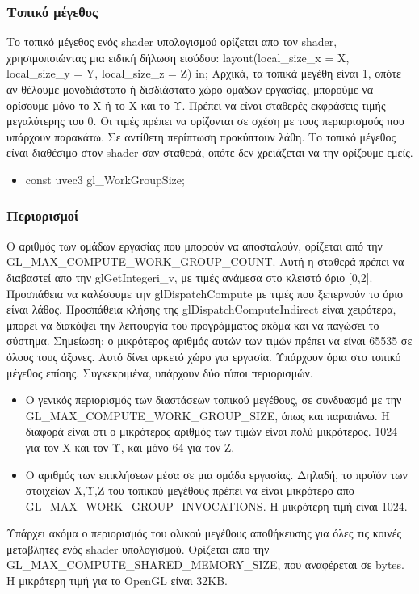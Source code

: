 \subsubsection{Τοπικό μέγεθος}
Το τοπικό μέγεθος ενός shader υπολογισμού ορίζεται απο τον shader, χρησιμοποιώντας μια ειδική δήλωση εισόδου: 
layout(local\_size\_x = X, local\_size\_y = Y, local\_size\_z = Z) in;
Αρχικά, τα τοπικά μεγέθη είναι 1, οπότε αν θέλουμε μονοδιάστατο ή δισδιάστατο χώρο ομάδων εργασίας, μπορούμε να ορίσουμε μόνο το Χ ή το Χ και το Υ. Πρέπει να είναι σταθερές εκφράσεις τιμής μεγαλύτερης του 0. Οι τιμές πρέπει να ορίζονται σε σχέση με τους περιορισμούς που υπάρχουν παρακάτω. Σε αντίθετη περίπτωση προκύπτουν λάθη. Το τοπικό μέγεθος είναι διαθέσιμο στον shader σαν σταθερά, οπότε δεν χρειάζεται να την ορίζουμε εμείς.
\begin{itemize}
\item const uvec3 gl\_WorkGroupSize;
\end{itemize}
\subsubsection{Περιορισμοί}
Ο αριθμός των ομάδων εργασίας που μπορούν να αποσταλούν, ορίζεται από την GL\_MAX\_COMPUTE\_WORK\_GROUP\_COUNT. Αυτή η σταθερά πρέπει να διαβαστεί απο την glGetIntegeri\_v, με τιμές ανάμεσα στο κλειστό όριο [0,2]. Προσπάθεια να καλέσουμε την glDispatchCompute με τιμές που ξεπερνούν το όριο είναι λάθος. Προσπάθεια κλήσης της glDispatchComputeIndirect είναι χειρότερα, μπορεί να διακόψει την λειτουργία του προγράμματος ακόμα και να παγώσει το σύστημα. Σημείωση: ο μικρότερος αριθμός αυτών των τιμών πρέπει να είναι 65535 σε όλους τους άξονες. Αυτό δίνει αρκετό χώρο για εργασία. Υπάρχουν όρια στο τοπικό μέγεθος επίσης. Συγκεκριμένα, υπάρχουν δύο τύποι περιορισμών. 
\begin{itemize}
\item Ο γενικός περιορισμός των διαστάσεων τοπικού μεγέθους, σε συνδυασμό με την GL\_MAX\_COMPUTE\_WORK\_GROUP\_SIZE, όπως και παραπάνω. Η διαφορά είναι οτι ο μικρότερος αριθμός των τιμών είναι πολύ μικρότερος. 1024 για τον Χ και τον Υ, και μόνο 64 για τον Ζ.
\item Ο αριθμός των επικλήσεων μέσα σε μια ομάδα εργασίας. Δηλαδή, το προϊόν των στοιχείων Χ,Υ,Ζ του τοπικού μεγέθους πρέπει να είναι μικρότερο απο GL\_MAX\_WORK\_GROUP\_INVOCATIONS. Η μικρότερη τιμή είναι 1024.
\end{itemize}
Υπάρχει ακόμα ο περιορισμός του ολικού μεγέθους αποθήκευσης για όλες τις κοινές μεταβλητές ενός shader υπολογισμού. Ορίζεται απο την GL\_MAX\_COMPUTE\_SHARED\_MEMORY\_SIZE, που αναφέρεται σε bytes. Η μικρότερη τιμή για το OpenGL είναι 32KB.
